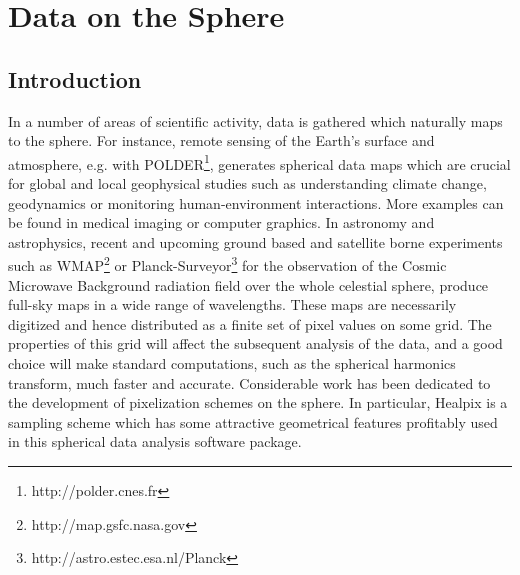 
\chapter{Data on the Sphere}
\label{ch_intro}

\section{Introduction}

In a number of areas of scientific activity, data is gathered which naturally maps to the sphere. For instance, remote sensing of the 
Earth's surface and atmosphere, e.g. with POLDER\footnote{http://polder.cnes.fr}, generates spherical data maps which are 
crucial for global and local geophysical studies such as understanding climate change, geodynamics or monitoring human-environment 
interactions. More examples can be found in medical imaging or computer graphics. In astronomy and astrophysics, recent and upcoming 
ground based and satellite borne experiments such as WMAP\footnote{http://map.gsfc.nasa.gov} or Planck-Surveyor\footnote{http://astro.estec.esa.nl/Planck} 
for the observation of the Cosmic Microwave Background radiation field over the whole celestial sphere,  produce full-sky 
maps in a wide range of wavelengths. These maps are necessarily digitized and hence distributed as a finite set of pixel values on some 
grid. The properties of this grid will affect the subsequent analysis of the data, and a good choice will make standard computations, 
such as the spherical harmonics transform, much faster and accurate. Considerable work has been dedicated to the development of 
pixelization schemes on the sphere. In particular, Healpix \citep{pixel:healpix} is a sampling scheme which has some attractive geometrical 
features profitably used in this spherical data analysis software package. \\

